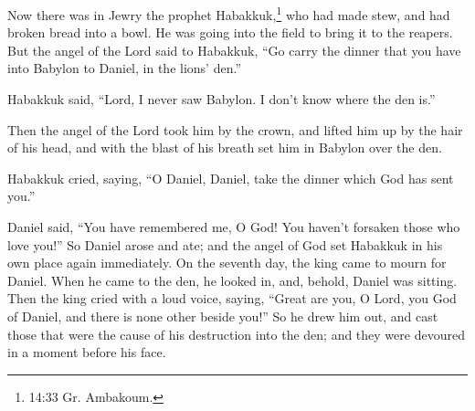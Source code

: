  Now there was in Jewry the prophet Habakkuk,\footnote{14:33
  Gr. Ambakoum.} who had made stew, and had broken bread into a bowl. He
was going into the field to bring it to the reapers.  But
the angel of the Lord said to Habakkuk, ``Go carry the dinner that you
have into Babylon to Daniel, in the lions' den.''

 Habakkuk said, ``Lord, I never saw Babylon. I don't know
where the den is.''

 Then the angel of the Lord took him by the crown, and
lifted him up by the hair of his head, and with the blast of his breath
set him in Babylon over the den.

 Habakkuk cried, saying, ``O Daniel, Daniel, take the
dinner which God has sent you.''

 Daniel said, ``You have remembered me, O God! You haven't
forsaken those who love you!''  So Daniel arose and ate;
and the angel of God set Habakkuk in his own place again immediately.
 On the seventh day, the king came to mourn for Daniel.
When he came to the den, he looked in, and, behold, Daniel was sitting.
 Then the king cried with a loud voice, saying, ``Great are
you, O Lord, you God of Daniel, and there is none other beside you!''
 So he drew him out, and cast those that were the cause of
his destruction into the den; and they were devoured in a moment before
his face.
